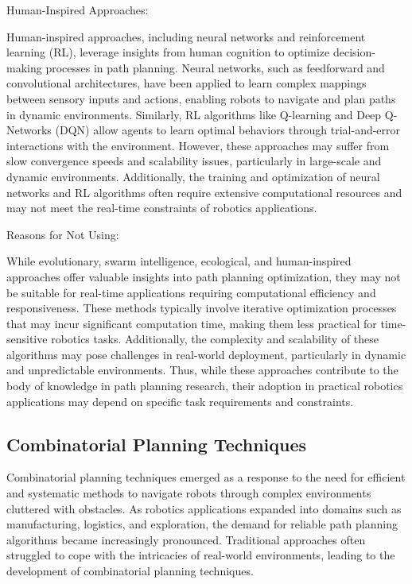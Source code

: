\vspace*{6mm}


Human-Inspired Approaches:

Human-inspired approaches, including neural networks and reinforcement learning (RL), leverage insights from human cognition to optimize decision-making processes in path planning. Neural networks, such as feedforward and convolutional architectures, have been applied to learn complex mappings between sensory inputs and actions, enabling robots to navigate and plan paths in dynamic environments. Similarly, RL algorithms like Q-learning and Deep Q-Networks (DQN) allow agents to learn optimal behaviors through trial-and-error interactions with the environment. However, these approaches may suffer from slow convergence speeds and scalability issues, particularly in large-scale and dynamic environments. Additionally, the training and optimization of neural networks and RL algorithms often require extensive computational resources and may not meet the real-time constraints of robotics applications.

\vspace*{6mm}


Reasons for Not Using:

While evolutionary, swarm intelligence, ecological, and human-inspired approaches offer valuable insights into path planning optimization, they may not be suitable for real-time applications requiring computational efficiency and responsiveness. These methods typically involve iterative optimization processes that may incur significant computation time, making them less practical for time-sensitive robotics tasks. Additionally, the complexity and scalability of these algorithms may pose challenges in real-world deployment, particularly in dynamic and unpredictable environments. Thus, while these approaches contribute to the body of knowledge in path planning research, their adoption in practical robotics applications may depend on specific task requirements and constraints.


\subsection{Combinatorial Planning Techniques}

Combinatorial planning techniques emerged as a response to the need for efficient and systematic methods to navigate robots through complex environments cluttered with obstacles. As robotics applications expanded into domains such as manufacturing, logistics, and exploration, the demand for reliable path planning algorithms became increasingly pronounced. Traditional approaches often struggled to cope with the intricacies of real-world environments, leading to the development of combinatorial planning techniques.

